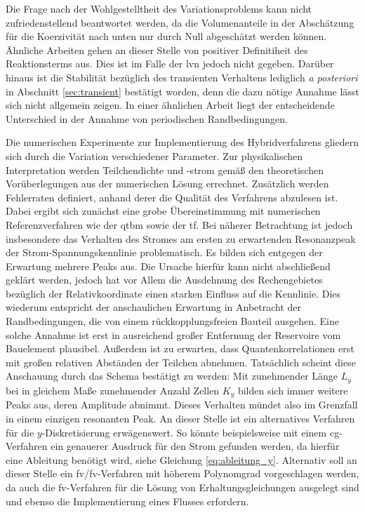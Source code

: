 Die Frage nach der Wohlgestelltheit des Variationsproblems kann nicht zufriedenstellend beantwortet werden, da die Volumenanteile in der Abschätzung für die Koerzivität nach unten nur durch Null abgeschätzt werden können. Ähnliche Arbeiten \cite{feistauer2007} gehen an dieser Stelle von positiver Definitiheit des Reaktionsterms aus. Dies ist im Falle der \ac{lvn} jedoch nicht gegeben. Darüber hinaus ist die Stabilität bezüglich des transienten Verhaltens lediglich \emph{a posteriori} in Abschnitt \ref{sec:transient} bestätigt worden, denn die dazu nötige Annahme lässt sich nicht allgemein zeigen. In einer ähnlichen Arbeit \cite{NLS} liegt der entscheidende Unterschied in der Annahme von periodischen Randbedingungen.

Die numerischen Experimente zur Implementierung des Hybridverfahrens gliedern sich durch die Variation verschiedener Parameter. Zur physikalischen Interpretation werden Teilchendichte und -strom gemäß den theoretischen Vorüberlegungen aus der numerischen Lösung errechnet. Zusätzlich werden Fehlerraten definiert, anhand derer die Qualität des Verfahrens abzulesen ist. Dabei ergibt sich zunächst eine grobe Übereinstimmung mit numerischen Referenzverfahren wie der \ac{qtbm} sowie der \ac{tf}. Bei näherer Betrachtung ist jedoch insbesondere das Verhalten des Stromes am ersten zu erwartenden Resonanzpeak der Strom-Spannungskennlinie problematisch. Es bilden sich entgegen der Erwartung mehrere Peaks aus. Die Ursache hierfür kann nicht abschließend geklärt werden, jedoch hat vor Allem die Ausdehnung des Rechengebietes bezüglich der Relativkoordinate einen starken Einfluss auf die Kennlinie. Dies wiederum entspricht der anschaulichen Erwartung in Anbetracht der Randbedingungen, die von einem rückkopplungsfreien Bauteil ausgehen. Eine solche Annahme ist erst in ausreichend großer Entfernung der Reservoire vom Bauelement plausibel. Außerdem ist zu erwarten, dass Quantenkorrelationen erst mit großen relativen Abständen der Teilchen abnehmen. Tatsächlich scheint diese Anschauung  durch das Schema bestätigt zu werden: Mit zunehmender Länge $L_y$ bei in gleichem Maße zunehmender Anzahl Zellen $K_y$ bilden sich immer weitere Peaks aus, deren Amplitude  abnimmt. Dieses Verhalten mündet also im Grenzfall in einem einzigen resonanten Peak. An dieser Stelle ist ein alternatives Verfahren für die $y$-Diskretisierung erwägenswert. So könnte beispielsweise mit einem \ac{cg}-Verfahren ein genauerer Ausdruck für den Strom gefunden werden, da hierfür eine Ableitung benötigt wird, siehe Gleichung \eqref{eq:ableitung_y}. Alternativ soll an dieser Stelle ein \ac{fv}/\ac{fv}-Verfahren mit höherem Polynomgrad vorgeschlagen werden, da auch die \ac{fv}-Verfahren für die Lösung von Erhaltungsgleichungen ausgelegt sind und ebenso die Implementierung eines Flusses erfordern.

